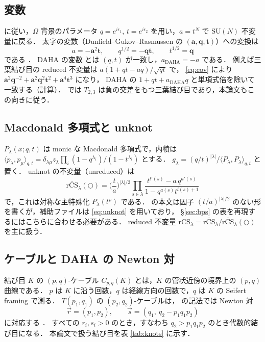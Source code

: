 \documentclass[11pt,a4paper]{ltjsarticle}
\theoremstyle{definition}
\theoremstyle{remark}
\newcommand{\rCS}{\overline{\mathrm{rCS}}}
\newcommand{\ba}{\mathbf{a}}
\newcommand{\bq}{\mathbf{q}}
\newcommand{\bt}{\mathbf{t}}
\begin{document}
\subsection{変数}

\cite{KN} に従い，$\Omega$ 背景のパラメータ $q=e^{i\epsilon_1}$, $t=e^{i\epsilon_2}$ を用い，$a=t^N$ で $\mathrm{SU}(N)$ 不変量に戻る．
太字の変数（Dunfield--Gukov--Rasmussen \cite{DGR} の $(\ba,\bq,\bt)$）への変換は
\begin{equation}\label{eq:cov}
a=-\ba^2\bt,\qquad q^{1/2}=-\bq\bt,\qquad t^{1/2}=\bq
\end{equation}
である \cite[\S4, 式 (cov)]{KN}．
DAHA の変数 \cite{CD14} とは $(q,t)$ が一致し，$a_{\mathrm{DAHA}}=-a$ である．
例えば三葉結び目の reduced 不変量は $a(1+qt-aq)/\sqrt{qt}$ で，
\eqref{eq:cov} により $\ba^2\bq^{-2}+\ba^2\bq^2\bt^2+\ba^4\bt^3$ \cite{DGR} になり，
DAHA の $1+qt+a_{\mathrm{DAHA}}q$ \cite{CD15} と単項式倍を除いて一致する（計算）．
\cite{DGR} では $T_{2,3}$ は負の交差をもつ三葉結び目であり，本論文もこの向きに従う．

\subsection{Macdonald 多項式と unknot}

$P_\lambda(x;q,t)$ は monic な Macdonald 多項式で，内積は
$\langle p_\lambda,p_\mu\rangle_{q,t}=\delta_{\lambda\mu}z_\lambda\prod_i(1-q^{\lambda_i})/(1-t^{\lambda_i})$ とする．
$g_\lambda=(q/t)^{|\lambda|}/\langle P_\lambda,P_\lambda\rangle_{q,t}$ と置く．
unknot の不変量（unreduced）は
\begin{equation}\label{eq:unknot}
\rCS_\lambda(\bigcirc)=\Big(\frac{t}{a}\Big)^{|\lambda|/2}\prod_{s\in\lambda}\frac{t^{l'(s)}-a\,q^{a'(s)}}{1-q^{a(s)}t^{l(s)+1}}
\end{equation}
で，これは対称な主特殊化 $P_\lambda(t^{\rho})$ である．
\cite{KN} の本文は因子 $(t/a)^{|\lambda|/2}$ のない形を書くが，補助ファイルは \eqref{eq:unknot} を用いており，
\S\ref{sec:bps} の表を再現するにはこちらに合わせる必要がある．
reduced 不変量 $\mathrm{rCS}_\lambda=\rCS_\lambda/\rCS_\lambda(\bigcirc)$ を主に扱う．

\subsection{ケーブルと DAHA の Newton 対}

結び目 $K$ の $(p,q)$-ケーブル $C_{p,q}(K)$ とは，$K$ の管状近傍の境界上の $(p,q)$ 曲線である．
$p$ は $K$ に沿う回数，$q$ は経線方向の回数で，$q$ は $K$ の Seifert framing で測る．
$T(p_1,q_1)$ の $(p_2,q_2)$-ケーブルは，\cite{CD14} の記法では Newton 対
\begin{equation}
\vec r=(p_1,p_2),\qquad \vec s=(q_1,\ q_2-p_1q_1p_2)
\end{equation}
に対応する \cite[\S2.1]{CD14}．
すべての $r_i,s_i>0$ のとき，すなわち $q_2>p_1q_1p_2$ のとき代数的結び目になる．
本論文で扱う結び目を表 \ref{tab:knots} に示す．
\end{document}
